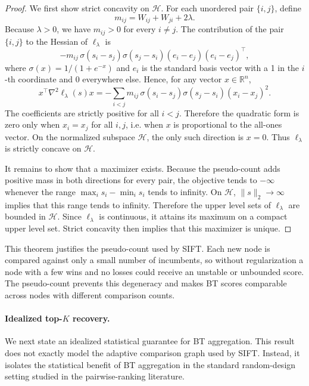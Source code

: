 \documentclass{article}
\begin{document}
\begin{proof}
We first show strict concavity on $\mathcal{H}$. For each unordered pair
$\{i,j\}$, define
\[
    m_{ij}=W_{ij}+W_{ji}+2\lambda .
\]
Because $\lambda>0$, we have $m_{ij}>0$ for every $i\neq j$. The contribution of
the pair $\{i,j\}$ to the Hessian of $\ell_\lambda$ is
\[
    -m_{ij}\,
    \sigma(s_i-s_j)\sigma(s_j-s_i)
    (e_i-e_j)(e_i-e_j)^\top,
\]
where $\sigma(x)=1/(1+e^{-x})$ and $e_i$ is the standard basis vector with a 1 in the $i$-th coordinate and 0 everywhere else. Hence, for any vector $x\in\mathbb{R}^n$,
\[
    x^\top \nabla^2 \ell_\lambda(s) x
    =
    -
    \sum_{i<j}
    m_{ij}\,
    \sigma(s_i-s_j)\sigma(s_j-s_i)
    (x_i-x_j)^2 .
\]
The coefficients are strictly positive for all $i<j$. Therefore the quadratic
form is zero only when $x_i=x_j$ for all $i,j$, i.e. when $x$ is proportional to
the all-ones vector. On the normalized subspace $\mathcal{H}$, the only such
direction is $x=0$. Thus $\ell_\lambda$ is strictly concave on $\mathcal{H}$.

It remains to show that a maximizer exists. Because the pseudo-count adds
positive mass in both directions for every pair, the objective tends to
$-\infty$ whenever the range $\max_i s_i-\min_i s_i$ tends to infinity. On
$\mathcal{H}$, $\|s\|_2\to\infty$ implies that this range tends to infinity.
Therefore the upper level sets of $\ell_\lambda$ are bounded in $\mathcal{H}$.
Since $\ell_\lambda$ is continuous, it attains its maximum on a compact upper
level set. Strict concavity then implies that this maximizer is unique.
\end{proof}

This theorem justifies the pseudo-count used by SIFT. Each new node is compared
against only a small number of incumbents, so without regularization a node with
a few wins and no losses could receive an unstable or unbounded score. The
pseudo-count prevents this degeneracy and makes BT scores comparable across
nodes with different comparison counts.

\paragraph{Idealized top-$K$ recovery.}
We next state an idealized statistical guarantee for BT aggregation. This result
does not exactly model the adaptive comparison graph used by SIFT. Instead, it
isolates the statistical benefit of BT aggregation in the standard random-design
setting studied in the pairwise-ranking literature.
\end{document}
